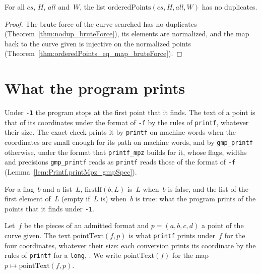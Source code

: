 \begin{theorem}\label{thm:nodup_orderedPoints}
  \leanok
  For all $\mathit{cs}$, $H$, $\mathit{all}$ and~$W$, the list
  $\mathrm{orderedPoints}(\mathit{cs}, H, \mathit{all}, W)$ has no duplicates.
\end{theorem}

\begin{proof}
  \leanok
  The brute force of the curve searched has no duplicates (Theorem~\ref{thm:nodup_bruteForce}),
  its elements are normalized, and the map back to the curve given is injective on the normalized
  points (Theorem~\ref{thm:orderedPoints_eq_map_bruteForce}).
\end{proof}

\section{What the program prints}\label{sec:theoremsProgram}

Under \texttt{-1} the program stops at the first point that it finds. The text of a point is that of
its coordinates under the format of \texttt{-f} by the rules of \texttt{printf}, whatever their
size. The exact check prints it by \texttt{printf} on machine words when the coordinates are small
enough for its path on machine words, and by \texttt{gmp\_printf} otherwise, under the format that
\texttt{printf\_mpz} builds for it, whose flags, widths and precisions \texttt{gmp\_printf} reads as
\texttt{printf} reads those of the format of \texttt{-f} (Lemma~\ref{lem:Printf.printMpz_gmpSpec}).

\begin{definition}\label{def:firstIf}
  \leanok
  For a flag~$b$ and a list~$L$, $\mathrm{firstIf}(b, L)$ is~$L$ when~$b$ is false, and the list of
  the first element of~$L$ (empty if~$L$ is) when~$b$ is true: what the program prints of the points
  that it finds under \texttt{-1}.
\end{definition}

\begin{definition}\label{def:pointText}
  \leanok
  Let~$f$ be the pieces of an admitted format and $p = (a, b, c, d)$ a point of the curve given.
  The text $\mathrm{pointText}(f, p)$ is what \texttt{printf} prints under~$f$ for the four
  coordinates, whatever their size: each conversion prints its coordinate by the rules of
  \texttt{printf} for a \texttt{long}, . We write
  $\mathrm{pointText}(f)$ for the map $p \mapsto \mathrm{pointText}(f, p)$.
\end{definition}


